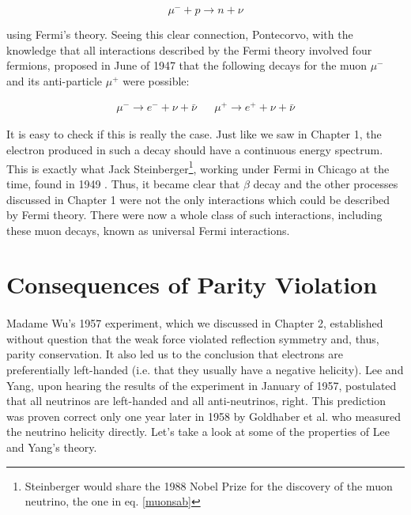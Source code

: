 \documentclass[12pt]{book}
\begin{document}
\begin{equation}\label{muonsab}
 \mu^{-}+p \rightarrow n+\nu
\end{equation}

using Fermi's theory. Seeing this clear connection, Pontecorvo, with the knowledge that all interactions described by the Fermi theory involved four fermions, proposed in June of 1947 that the following decays for the muon $\mu^{-}$ and its anti-particle $\mu^{+}$ were possible\cite{pontecorvo}:

\begin{align}
 \mu^{-}\rightarrow e^{-}+\nu+\bar{\nu} & & \mu^{+}\rightarrow e^{+}+\nu+\bar{\nu}
\end{align}

It is easy to check if this is really the case. Just like we saw in Chapter 1, the electron produced in such a decay should have a continuous energy spectrum. This is exactly what Jack Steinberger\footnote{Steinberger would share the 1988 Nobel Prize for the discovery of the muon neutrino, the one in eq. \ref{muonsab}}, working under Fermi in Chicago at the time, found in 1949 \cite{steinberger}. Thus, it became clear that $\beta$ decay and the other processes discussed in Chapter 1 were not the only interactions which could be described by Fermi theory. There were now a whole class of such interactions, including these muon decays, known as universal Fermi interactions.


\section{Consequences of Parity Violation}

\paragraph{}Madame Wu's 1957 experiment, which we discussed in Chapter 2, established without question that the weak force violated reflection symmetry and, thus, parity conservation. It also led us to the conclusion that electrons are preferentially left-handed (i.e. that they usually have a negative helicity). Lee and Yang, upon hearing the results of the experiment in January of 1957, postulated that all neutrinos are left-handed and all anti-neutrinos, right. This prediction was proven correct only one year later in 1958 by Goldhaber et al. \cite{goldhaber} who measured the neutrino helicity directly. Let's take a look at some of the properties of Lee and Yang's theory.
\end{document}
